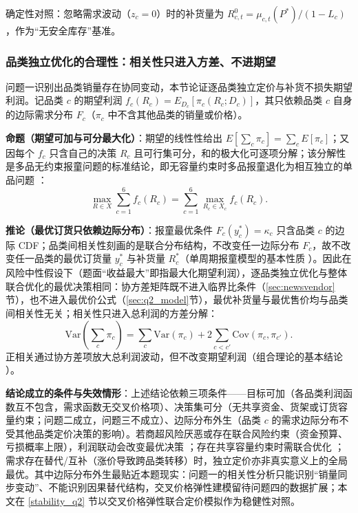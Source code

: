 确定性对照：忽略需求波动（$z_c=0$）时的补货量为 $R^0_{c,t}=\mu_{c,t}(P^*)/(1-L_c)$，作为“无安全库存”基准。

\subsubsection{品类独立优化的合理性：相关性只进入方差、不进期望}

问题一识别出品类销量存在协同变动，本节论证逐品类独立定价与补货不损失期望利润。记品类 $c$ 的期望利润 $f_c(R_c)=E_{D_c}\left[\pi_c(R_c;D_c)\right]$，其只依赖品类 $c$ 自身的边际需求分布 $F_c$（$\pi_c$ 中不含其他品类的销量或价格）。

\textbf{命题（期望可加与可分最大化）}：期望的线性性给出 $E[\sum_c\pi_c]=\sum_c E[\pi_c]$；又因每个 $f_c$ 只含自己的决策 $R_c$ 且可行集可分，和的极大化可逐项分解；该分解性是多品无约束报童问题的标准结论，即无容量约束时多品报童退化为相互独立的单品问题 \cite{silver2016,erlebacher2000}：
\begin{equation}
\max_{R\in X}\sum_{c=1}^{6}f_c(R_c)=\sum_{c=1}^{6}\max_{R_c\in X_c}f_c(R_c).
\end{equation}

\textbf{推论（最优订货只依赖边际分布）}：报童最优条件 $F_c(y^*_c)=\kappa_c$ 只含品类 $c$ 的边际 CDF；品类间相关性刻画的是联合分布结构，不改变任一边际分布 $F_c$，故不改变任一品类的最优订货量 $y^*_c$ 与补货量 $R^*_c$（单周期报童模型的基本性质 \cite{arrow1951,khouja1999,petruzzi1999}）。因此在风险中性假设下（题面“收益最大”即指最大化期望利润），逐品类独立优化与整体联合优化的最优决策相同：协方差矩阵既不进入临界比条件（\ref{sec:newsvendor}节），也不进入最优价公式（\ref{sec:q2_model}节），最优补货量与最优售价均与品类间相关性无关；相关性只进入总利润的方差分解：
\begin{equation}
\mathrm{Var}\left(\sum_c\pi_c\right)=\sum_c\mathrm{Var}(\pi_c)+2\sum_{c<c'}\mathrm{Cov}(\pi_c,\pi_{c'}).
\end{equation}
正相关通过协方差项放大总利润波动，但不改变期望利润（组合理论的基本结论 \cite{markowitz1952}）。

\textbf{结论成立的条件与失效情形}：上述结论依赖三项条件——目标可加（各品类利润函数互不包含，需求函数无交叉价格项）、决策集可分（无共享资金、货架或订货容量约束；问题二成立，问题三不成立）、边际分布外生（品类 $c$ 的需求边际分布不受其他品类定价决策的影响）。若商超风险厌恶或存在联合风险约束（资金预算、亏损概率上限），利润联动会改变最优决策 \cite{eeckhoudt1995,chen2009}；存在共享容量约束时需联合优化 \cite{erlebacher2000,abdelmalek2004}；需求存在替代/互补（涨价导致跨品类转移）时，独立定价亦非真实意义上的全局最优。其中边际分布外生最贴近本题现实：问题一的相关性分析只能识别“销量同步变动”、不能识别因果替代结构，交叉价格弹性建模留待问题四的数据扩展；本文在 \ref{stability_q2} 节以交叉价格弹性联合定价模拟作为稳健性对照。


